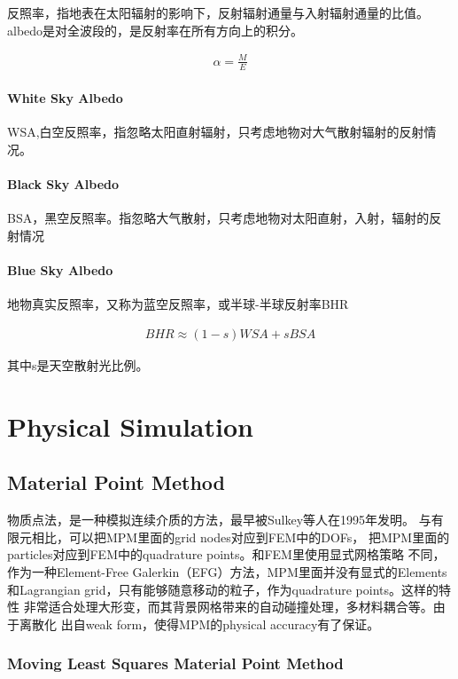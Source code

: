 反照率，指地表在太阳辐射的影响下，反射辐射通量与入射辐射通量的比值。albedo是对全波段的，是反射率在所有方向上的积分。

\begin{align*}
    \alpha = \frac{M}{E}
\end{align*}

\subsubsection{White Sky Albedo}

WSA,白空反照率，指忽略太阳直射辐射，只考虑地物对大气散射辐射的反射情况。

\subsubsection{Black Sky Albedo}

BSA，黑空反照率。指忽略大气散射，只考虑地物对太阳直射，入射，辐射的反射情况

\subsubsection{Blue Sky Albedo}

地物真实反照率，又称为蓝空反照率，或半球-半球反射率BHR

\begin{align*}
    BHR \approx (1-s)WSA + sBSA 
\end{align*}

其中s是天空散射光比例。


\chapter{Physical Simulation}

\section{Material Point Method}

物质点法，是一种模拟连续介质的方法，最早被Sulkey等人在1995年发明。
与有限元相比，可以把MPM里面的grid nodes对应到FEM中的DOFs，
把MPM里面的particles对应到FEM中的quadrature points。和FEM里使用显式网格策略
不同，作为一种Element-Free Galerkin（EFG）方法，MPM里面并没有显式的Elements
和Lagrangian grid，只有能够随意移动的粒子，作为quadrature points。这样的特性
非常适合处理大形变，而其背景网格带来的自动碰撞处理，多材料耦合等。由于离散化
出自weak form，使得MPM的physical accuracy有了保证。

\subsection{Moving Least Squares Material Point Method}

